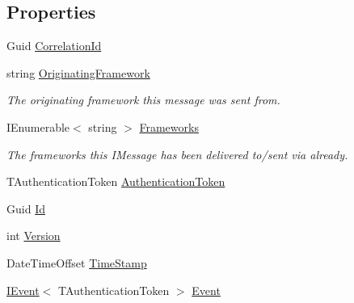 \subsection*{Properties}
\begin{DoxyCompactItemize}
\item 
Guid \hyperlink{classCqrs_1_1Events_1_1SagaEvent_a3bd1014469c88b763173da28a7d5023c_a3bd1014469c88b763173da28a7d5023c}{Correlation\+Id}
\item 
string \hyperlink{classCqrs_1_1Events_1_1SagaEvent_a58fda921f9a06762dcb7eee86390820a_a58fda921f9a06762dcb7eee86390820a}{Originating\+Framework}
\begin{DoxyCompactList}\small\item\em The originating framework this message was sent from. \end{DoxyCompactList}\item 
I\+Enumerable$<$ string $>$ \hyperlink{classCqrs_1_1Events_1_1SagaEvent_a2a52816a942f9d69a3bec20f632b853d_a2a52816a942f9d69a3bec20f632b853d}{Frameworks}
\begin{DoxyCompactList}\small\item\em The frameworks this I\+Message has been delivered to/sent via already. \end{DoxyCompactList}\item 
T\+Authentication\+Token \hyperlink{classCqrs_1_1Events_1_1SagaEvent_a9b5abd2cc59f97f53eaa2c2277733e7f_a9b5abd2cc59f97f53eaa2c2277733e7f}{Authentication\+Token}
\item 
Guid \hyperlink{classCqrs_1_1Events_1_1SagaEvent_a995f70a4311341459b96bd00488f0eea_a995f70a4311341459b96bd00488f0eea}{Id}
\item 
int \hyperlink{classCqrs_1_1Events_1_1SagaEvent_a4918d2e0a66897600143f1e645a0f136_a4918d2e0a66897600143f1e645a0f136}{Version}
\item 
Date\+Time\+Offset \hyperlink{classCqrs_1_1Events_1_1SagaEvent_a6e522969d3456b62fe4291c5abc7e888_a6e522969d3456b62fe4291c5abc7e888}{Time\+Stamp}
\item 
\hyperlink{interfaceCqrs_1_1Events_1_1IEvent}{I\+Event}$<$ T\+Authentication\+Token $>$ \hyperlink{classCqrs_1_1Events_1_1SagaEvent_ad965f37f2c485f04978237f0d1be9cb7_ad965f37f2c485f04978237f0d1be9cb7}{Event}
\end{DoxyCompactItemize}


